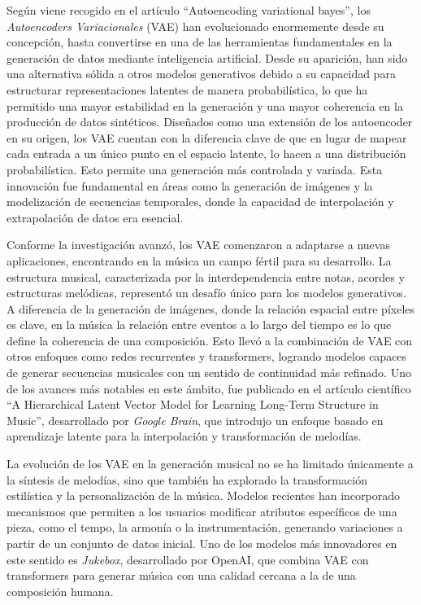 Según viene recogido en el artículo ``Autoencoding variational bayes''\citep{kingma2013vae}, los \emph{Autoencoders Variacionales} (VAE) han evolucionado enormemente desde su concepción, hasta convertirse en una de las herramientas fundamentales en la generación de datos mediante inteligencia artificial. Desde su aparición, han sido una alternativa sólida a otros modelos generativos debido a su capacidad para estructurar representaciones latentes de manera probabilística, lo que ha permitido una mayor estabilidad en la generación y una mayor coherencia en la producción de datos sintéticos. Diseñados como una extensión de los autoencoder en su origen, los VAE cuentan con la diferencia clave de que en lugar de mapear cada entrada a un único punto en el espacio latente, lo hacen a una distribución probabilística. Esto permite una generación más controlada y variada. Esta innovación fue fundamental en áreas como la generación de imágenes y la modelización de secuencias temporales, donde la capacidad de interpolación y extrapolación de datos era esencial.

Conforme la investigación avanzó, los VAE comenzaron a adaptarse a nuevas aplicaciones, encontrando en la música un campo fértil para su desarrollo. La estructura musical, caracterizada por la interdependencia entre notas, acordes y estructuras melódicas, representó un desafío único para los modelos generativos. A diferencia de la generación de imágenes, donde la relación espacial entre píxeles es clave, en la música la relación entre eventos a lo largo del tiempo es lo que define la coherencia de una composición. Esto llevó a la combinación de VAE con otros enfoques como redes recurrentes y transformers, logrando modelos capaces de generar secuencias musicales con un sentido de continuidad más refinado. Uno de los avances más notables en este ámbito, fue publicado en el artículo científico ``A Hierarchical Latent Vector Model for Learning Long-Term Structure in Music''\citep{roberts2018musicvae}, desarrollado por \emph{Google Brain}, que introdujo un enfoque basado en aprendizaje latente para la interpolación y transformación de melodías.

La evolución de los VAE en la generación musical no se ha limitado únicamente a la síntesis de melodías, sino que también ha explorado la transformación estilística y la personalización de la música. Modelos recientes han incorporado mecanismos que permiten a los usuarios modificar atributos específicos de una pieza, como el tempo, la armonía o la instrumentación, generando variaciones a partir de un conjunto de datos inicial. Uno de los modelos más innovadores en este sentido es \emph{Jukebox}, desarrollado por OpenAI, que combina VAE con transformers para generar música con una calidad cercana a la de una composición humana.

